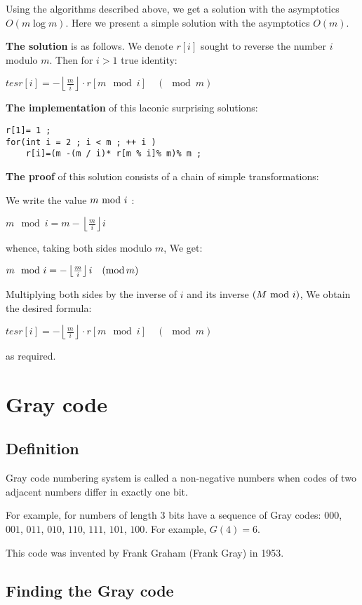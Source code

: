 Using the algorithms described above, we get a solution with the asymptotics $O (m \log m)$. Here we present a simple solution with the asymptotics $O (m)$.

\textbf{The solution} is as follows. We denote $r [i]$ sought to reverse the number $i$ modulo $m$. Then for $i> 1$ true identity:

$tesr[i]=-\left\lfloor \frac{m}{i}\right\rfloor \cdot r[m\mod i]\quad(\mod m)$

\textbf{The implementation} of this laconic surprising solutions:

\begin{verbatim}
r[1]= 1 ;
for(int i = 2 ; i < m ; ++ i )
    r[i]=(m -(m / i)* r[m % i]% m)% m ; 
\end{verbatim}
\textbf{The proof} of this solution consists of a chain of simple transformations:

We write the value $m {\rm ~ mod ~} i$ :

$m\mod i=m-\left\lfloor \frac{m}{i}\right\rfloor i$

whence, taking both sides modulo $m$, We get:

$m\mod i=-\left\lfloor \frac{m}{i}\right\rfloor i\quad({\rm {\rm mod\,}}m)$

Multiplying both sides by the inverse of $i$ and its inverse $(M {\rm ~ mod ~} i)$, We obtain the desired formula:

$tesr[i]=-\left\lfloor \frac{m}{i}\right\rfloor \cdot r[m\mod i]\quad(\mod m)$

as required.

\section{ Gray code }
\subsection{ Definition }

Gray code numbering system is called a non-negative numbers when codes of two adjacent numbers differ in exactly one bit.

For example, for numbers of length 3 bits have a sequence of Gray codes: $000$, $001$, $011$, $010$, $110$, $111$, $101$, $100$. For example, $G (4) = 6$.

This code was invented by Frank Graham (Frank Gray) in 1953.

\subsection{ Finding the Gray code }

